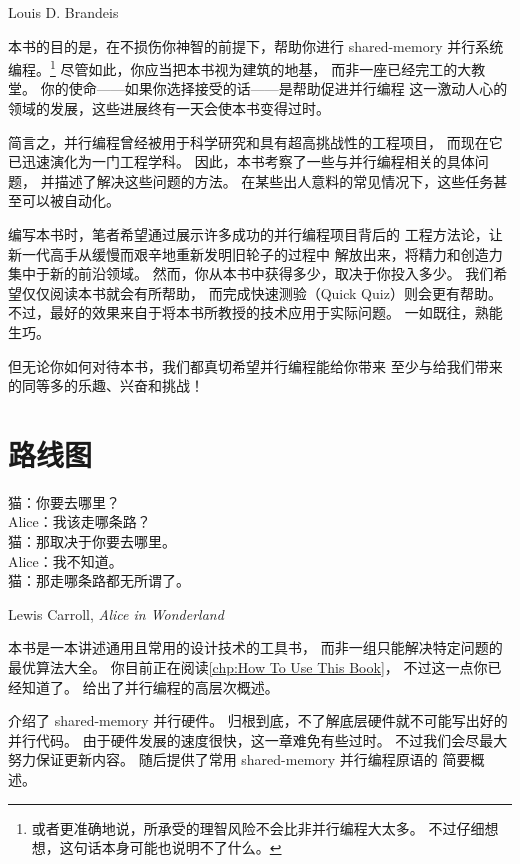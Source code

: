 
%
	 {Louis D. Brandeis}

本书的目的是，在不损伤你神智的前提下，帮助你进行
shared-memory 并行系统编程。\footnote{
	或者更准确地说，所承受的理智风险不会比非并行编程大太多。
	不过仔细想想，这句话本身可能也说明不了什么。}
尽管如此，你应当把本书视为建筑的地基，
而非一座已经完工的大教堂。
你的使命——如果你选择接受的话——是帮助促进并行编程
这一激动人心的领域的发展，这些进展终有一天会使本书变得过时。

简言之，并行编程曾经被用于科学研究和具有超高挑战性的工程项目，
而现在它已迅速演化为一门工程学科。
因此，本书考察了一些与并行编程相关的具体问题，
并描述了解决这些问题的方法。
在某些出人意料的常见情况下，这些任务甚至可以被自动化。

编写本书时，笔者希望通过展示许多成功的并行编程项目背后的
工程方法论，让新一代高手从缓慢而艰辛地重新发明旧轮子的过程中
解放出来，将精力和创造力集中于新的前沿领域。
然而，你从本书中获得多少，取决于你投入多少。
我们希望仅仅阅读本书就会有所帮助，
而完成快速测验（Quick Quiz）则会更有帮助。
不过，最好的效果来自于将本书所教授的技术应用于实际问题。
一如既往，熟能生巧。

但无论你如何对待本书，我们都真切希望并行编程能给你带来
至少与给我们带来的同等多的乐趣、兴奋和挑战！

\section{路线图}
\label{sec:howto:Roadmap}
%
\epigraph{猫：你要去哪里？ \\
	  Alice：我该走哪条路？ \\
	  猫：那取决于你要去哪里。 \\
	  Alice：我不知道。 \\
	  猫：那走哪条路都无所谓了。}
	 {Lewis Carroll, \emph{Alice in Wonderland}}

本书是一本讲述通用且常用的设计技术的工具书，
而非一组只能解决特定问题的最优算法大全。
你目前正在阅读\cref{chp:How To Use This Book}，
不过这一点你已经知道了。
给出了并行编程的高层次概述。

介绍了 shared-memory 并行硬件。
归根到底，不了解底层硬件就不可能写出好的并行代码。
由于硬件发展的速度很快，这一章难免有些过时。
不过我们会尽最大努力保证更新内容。
随后提供了常用 shared-memory 并行编程原语的
简要概述。

